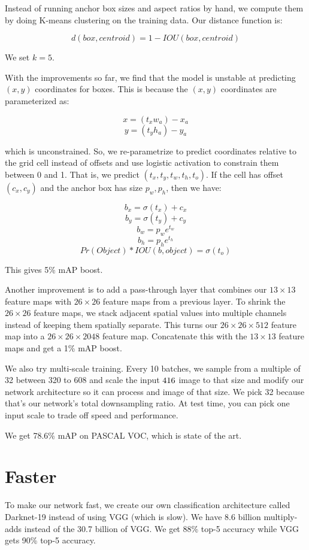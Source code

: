 \documentclass[a4paper]{article}
\begin{document}
Instead of running anchor box sizes and aspect ratios by hand, we compute them
by doing K-means clustering on the training data. Our distance function is:

$$
d(box, centroid) = 1 - IOU(box, centroid)
$$

We set $k = 5$.

With the improvements so far, we find that the model is unstable at predicting
$(x, y)$ coordinates for boxes. This is because the $(x, y)$ coordinates are
parameterized as:

$$
x = (t_x w_a) - x_a
$$
$$
y = (t_y h_a) - y_a
$$

which is unconstrained. So, we re-parametrize to predict coordinates relative to
the grid cell instead of offsets and use logistic activation to constrain them
between 0 and 1. That is, we predict $(t_x, t_y, t_w, t_h, t_o)$. If the
cell has offset $(c_x, c_y)$ and the anchor box has size $p_w, p_h$, then we
have:

$$b_x = \sigma(t_x) + c_x$$
$$b_y = \sigma(t_y) + c_y$$
$$b_w = p_w e^{t_w}$$
$$b_h = p_h e^{t_h}$$
$$Pr(Object) * IOU(b, object) = \sigma(t_o)$$

This gives 5\% mAP boost.

Another improvement is to add a pass-through layer that combines our $13 \times
13$ feature maps with $26 \times 26$ feature maps from a previous layer. To
shrink the $26 \times 26$ feature maps, we stack adjacent spatial values into
multiple channels instead of keeping them spatially separate. This turns our
$26 \times 26 \times 512$ feature map into a $26 \times 26 \times 2048$ feature
map. Concatenate this with the $13 \times 13$ feature maps and get a 1\% mAP
boost.

We also try multi-scale training. Every 10 batches, we sample from a multiple
of 32 between 320 to 608 and scale the input $416 \time 416$ image to that size
and modify our network architecture so it can process and image of that size. We
pick 32 because that's our network's total downsampling ratio. At test time,
you can pick one input scale to trade off speed and performance.

We get 78.6\% mAP on PASCAL VOC, which is state of the art.

\section{Faster}
To make our network fast, we create our own classification architecture called
Darknet-19 instead of using VGG (which is slow). We have 8.6 billion
multiply-adds instead of the 30.7 billion of VGG. We get 88\% top-5 accuracy
while VGG gets 90\% top-5 accuracy.
\end{document}
